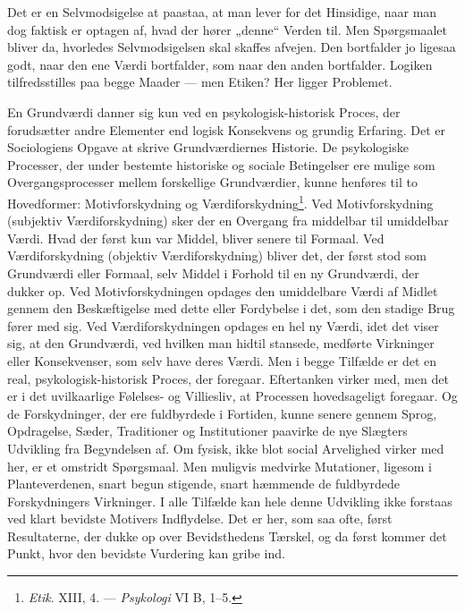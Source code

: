 \documentclass[12pt,a4paper]{book}
\newcommand{\opage}[1]{\marginnote{\footnotesize\textit{[#1]}}}
\newcommand{\apage}[1]{\marginnote{\footnotesize\textit{[#1]}}}
\begin{document}
\apage{361} Det er en Selvmodsigelse at paastaa, at man lever for det Hinsidige, naar man dog faktisk
er optagen af, hvad der hører „denne“ Verden til. Men Spørgsmaalet bliver da, hvorledes
Selvmodsigelsen skal skaffes afvejen. Den bortfalder jo ligesaa godt, naar den ene Værdi
bortfalder, som naar den anden bortfalder. Logiken tilfredsstilles paa begge Maader --- men
Etiken? Her ligger Problemet.

En Grundværdi danner sig kun ved en psykologisk-historisk Proces, der forudsætter andre Elementer end logisk Konsekvens og grundig Erfaring. Det er Sociologiens Opgave at skrive
Grundværdiernes Historie. De psykologiske Processer, der under bestemte historiske og
sociale Betingelser ere mulige som Overgangsprocesser mellem forskellige Grundværdier,
kunne henføres til to Hovedformer: Motivforskydning og
Værdiforskydning\footnote{\emph{Etik}. XIII, 4. --- \emph{Psykologi} VI B, 1--5.}. Ved
Motivforskydning (subjektiv Værdiforskydning) sker der en Overgang fra middelbar til
umiddelbar Værdi. Hvad der først kun var Middel, bliver senere til Formaal. Ved Værdiforskydning
(objektiv Værdiforskydning) bliver det, der først stod som Grundværdi eller Formaal, selv
Middel i Forhold til en ny Grundværdi, der dukker op. Ved Motivforskydningen opdages den
umiddelbare Værdi af Midlet gennem den Beskæftigelse med dette eller Fordybelse i det, som
den stadige Brug fører med sig. Ved Værdiforskydningen opdages en hel ny Værdi, idet det
viser sig, at den Grundværdi, ved hvilken man hidtil stansede, medførte Virkninger eller
Konsekvenser, som selv have deres Værdi. Men i begge Tilfælde er det en real,
psykologisk-historisk Proces, der foregaar. Eftertanken virker med, men det er i det
uvilkaarlige Følelses- og Villiesliv, at Processen hovedsageligt foregaar. Og de
Forskydninger, der ere fuldbyrdede i Fortiden, kunne senere gennem Sprog, Opdragelse,
Sæder, Traditioner og Institutioner paavirke de nye Slægters Udvikling fra Begyndelsen af.
Om fysisk, ikke blot social Arvelighed virker med her, er et omstridt Spørgsmaal. Men
muligvis medvirke Mutationer, ligesom i Planteverdenen, snart begun%
\opage{362}stigende, snart hæmmende
de fuldbyrdede Forskydningers Virkninger. I alle Tilfælde kan hele denne Udvikling ikke
forstaas ved klart bevidste Motivers Indflydelse. Det er her, som saa ofte, først
Resultaterne, der dukke op over Bevidsthedens Tærskel, og da først kommer det Punkt, hvor
den bevidste Vurdering kan gribe ind.
\end{document}
